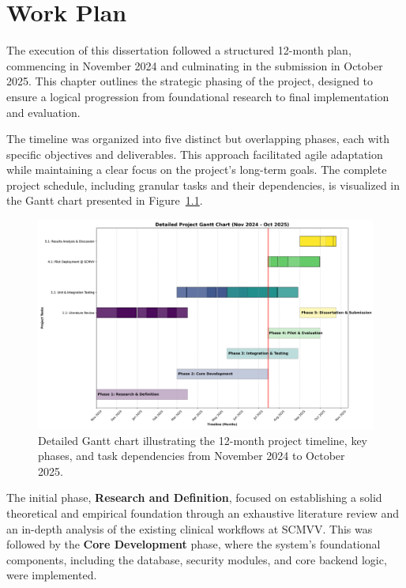 \chapter{Work Plan}
\label{chap:WorkPlan}

The execution of this dissertation followed a structured 12-month plan, commencing in November 2024 and culminating in the submission in October 2025. This chapter outlines the strategic phasing of the project, designed to ensure a logical progression from foundational research to final implementation and evaluation.

The timeline was organized into five distinct but overlapping phases, each with specific objectives and deliverables. This approach facilitated agile adaptation while maintaining a clear focus on the project's long-term goals. The complete project schedule, including granular tasks and their dependencies, is visualized in the Gantt chart presented in Figure~\ref{fig:gantt_chart_detailed}.

\begin{figure}[htbp]
    \centering
    \includegraphics[width=\textwidth]{images/generated/gantt_chart_detailed.png}
    \caption{Detailed Gantt chart illustrating the 12-month project timeline, key phases, and task dependencies from November 2024 to October 2025.}
    \label{fig:gantt_chart_detailed}
\end{figure}

The initial phase, \textbf{Research and Definition}, focused on establishing a solid theoretical and empirical foundation through an exhaustive literature review and an in-depth analysis of the existing clinical workflows at SCMVV. This was followed by the \textbf{Core Development} phase, where the system's foundational components, including the database, security modules, and core backend logic, were implemented.

